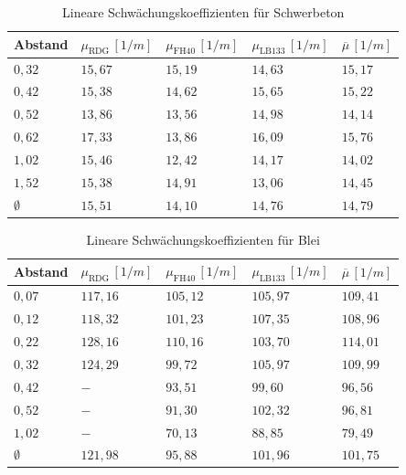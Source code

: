 \documentclass[12pt,german]{article}
\begin{document}
    \begin{table}[H]
        \centering
        \begin{tabularx}{\textwidth}{X|X|X|X|X}
            \toprule
            \textbf{Abstand} & $ \mu_{\text{RDG}}\, [1/m] $ & $ \mu_{\text{FH40}}\, [1/m]  $ & $ \mu_{\text{LB133}}\, [1/m]  $ & $ \overline{\mu}\, [1/m]  $ \\
            \midrule
            $   0,32 $ & $  15,67 $ & $  15,19 $ & $  14,63 $ & $  15,17 $ \\
            $   0,42 $ & $  15,38 $ & $  14,62 $ & $  15,65 $ & $  15,22 $ \\
            $   0,52 $ & $  13,86 $ & $  13,56 $ & $  14,98 $ & $  14,14 $ \\
            $   0,62 $ & $  17,33 $ & $  13,86 $ & $  16,09 $ & $  15,76 $ \\
            $   1,02 $ & $  15,46 $ & $  12,42 $ & $  14,17 $ & $  14,02 $ \\
            $   1,52 $ & $  15,38 $ & $  14,91 $ & $  13,06 $ & $  14,45 $ \\
            \midrule
            $\emptyset$ & $  15,51 $ & $  14,10 $ & $  14,76 $ & $  14,79 $ \\
            \bottomrule
        \end{tabularx}
        \caption{Lineare Schwächungskoeffizienten für Schwerbeton}
    \end{table}
    \begin{table}[H]
        \centering
        \begin{tabularx}{\textwidth}{X|X|X|X|X}
            \toprule
            \textbf{Abstand} & $ \mu_{\text{RDG}}\, [1/m] $ & $ \mu_{\text{FH40}}\, [1/m]  $ & $ \mu_{\text{LB133}}\, [1/m]  $ & $ \overline{\mu}\, [1/m]  $ \\
            \midrule
            $   0,07 $ & $ 117,16 $ & $ 105,12 $ & $ 105,97 $ & $ 109,41 $ \\
            $   0,12 $ & $ 118,32 $ & $ 101,23 $ & $ 107,35 $ & $ 108,96 $ \\
            $   0,22 $ & $ 128,16 $ & $ 110,16 $ & $ 103,70 $ & $ 114,01 $ \\
            $   0,32 $ & $ 124,29 $ & $  99,72 $ & $ 105,97 $ & $ 109,99 $ \\
            $   0,42 $ & $     -  $ & $  93,51 $ & $  99,60 $ & $  96,56 $ \\
            $   0,52 $ & $     -  $ & $  91,30 $ & $ 102,32 $ & $  96,81 $ \\
            $   1,02 $ & $     -  $ & $  70,13 $ & $  88,85 $ & $  79,49 $ \\
            \midrule
            $\emptyset$ & $ 121,98 $ & $  95,88 $ & $ 101,96 $ & $ 101,75 $ \\
            \bottomrule
        \end{tabularx}
        \caption{Lineare Schwächungskoeffizienten für Blei}
    \end{table}
\end{document}
